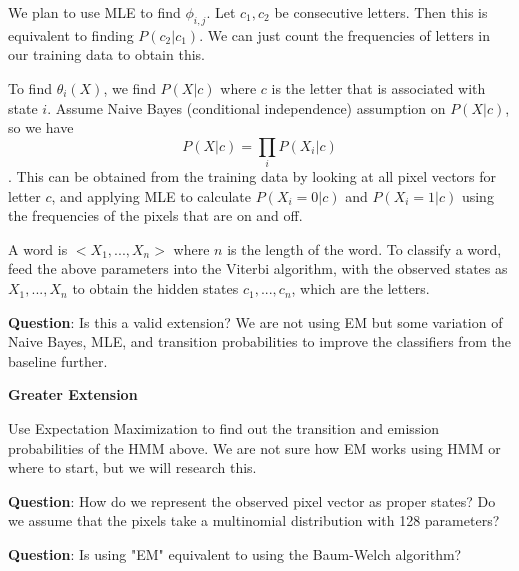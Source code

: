 \documentclass[11pt]{article}
\begin{document}
We plan to use MLE to find $\phi_{i,j}$. Let $c_1, c_2$ be consecutive letters. Then this is equivalent to finding $P(c_2 | c_1)$. We can just count the frequencies of letters in our training data to obtain this.

To find $\theta_{i}(X)$, we find $P(X | c)$ where $c$ is the letter that is associated with state $i$. Assume Naive Bayes (conditional independence) assumption on $P(X | c)$, so we have $$ P(X | c) = \prod_i P(X_i | c)$$. This can be obtained from the training data by looking at all pixel vectors for letter $c$, and applying MLE to calculate $P(X_i = 0 | c)$ and $P(X_i = 1 | c)$ using the frequencies of the pixels that are on and off.

A word is $<X_1, ..., X_n>$ where $n$ is the length of the word. To classify a word, feed the above parameters into the Viterbi algorithm, with the observed states as $X_1, ..., X_n$ to obtain the hidden states $c_1, ..., c_n$, which are the letters.

\textbf{Question}: Is this a valid extension? We are not using EM but some variation of Naive Bayes, MLE, and transition probabilities to improve the classifiers from the baseline further.

\textbf{Greater Extension}

Use Expectation Maximization to find out the transition and emission probabilities of the HMM above. We are not sure how EM works using HMM or where to start, but we will research this.

\textbf{Question}: How do we represent the observed pixel vector as proper states? Do we assume that the pixels take a multinomial distribution with 128 parameters?

\textbf{Question}: Is using "EM" equivalent to using the Baum-Welch algorithm?

\end{document}
